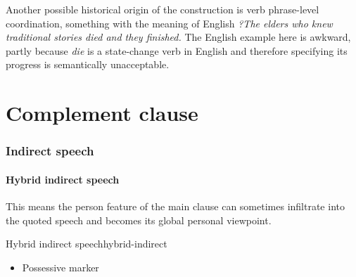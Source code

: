 \documentclass[a4paper, oneside, 12pt]{report}
\newcommand{\form}[1]{\emph{#1}}
\begin{document}
Another possible historical origin of the construction 
is verb phrase-level coordination,  
something with the meaning of 
English \form{?The elders who knew traditional stories died and they finished.}
The English example here is awkward, 
partly because \form{die} is a state-change verb in English 
and therefore specifying its progress is semantically unacceptable.

\chapter{Complement clause}

\subsection{Indirect speech}

\subsubsection{Hybrid indirect speech}\label{sec:complement.indirect.hybrid}

This means the person feature of the main clause
can sometimes infiltrate into the quoted speech
and becomes its global personal viewpoint.

\begin{todobox}{Hybrid indirect speech}{hybrid-indirect}
    \begin{itemize}
        \item Possessive marker
    \end{itemize}
\end{todobox}



\end{document}
